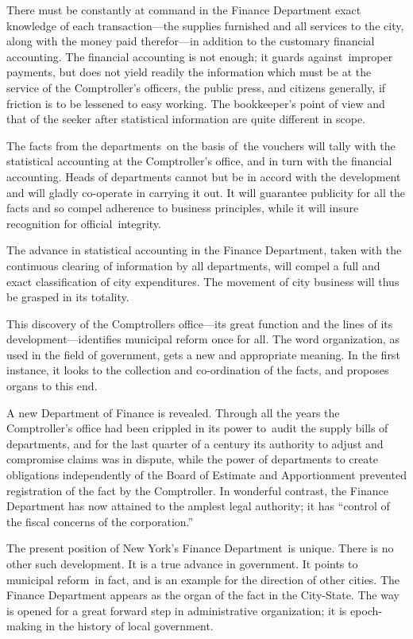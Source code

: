 \documentclass[openany,nobib]{tufte-book}
\begin{document}
There must be constantly at command in the Finance Department exact
knowledge of each transaction---the supplies furnished and all services
to the city, along with the money paid therefor---in addition to the
customary financial accounting. The financial accounting is not enough;
it guards against~improper payments, but does not yield readily the
information which must be at the service of the Comptroller's officers,
the public press, and citizens generally, if friction is to be lessened
to easy working. The bookkeeper's point of view and that of the seeker
after statistical information are quite different in scope.~

The facts from the departments~on the basis of~the vouchers will tally
with the statistical accounting at the Comptroller's office, and in turn
with the financial accounting. Heads of departments cannot but be in
accord with the development and will gladly co-operate in carrying it
out. It will guarantee publicity for all the facts and so compel
adherence to business principles, while it will insure recognition for
official~integrity.~

The advance in statistical accounting in the Finance Department, taken
with the continuous clearing of information by all departments, will
compel a full and exact classification of city expenditures. The
movement of city business will thus be grasped in its totality.~

This discovery of the Comptroller\textquotesingle s office---its great
function and the lines of its development---identifies municipal reform
once for all. The word organization, as used in the field of government,
gets a new and appropriate meaning. In the first instance, it looks to
the collection and co-ordination of the facts, and proposes organs to
this end.~

A new Department of Finance is revealed. Through all the years the
Comptroller's office had been crippled in its power to~audit the supply
bills of departments, and for the last quarter of a century its
authority to adjust and compromise claims was in dispute, while the
power of departments to create obligations independently of the Board of
Estimate and Apportionment prevented registration of the fact by the
Comptroller. In wonderful contrast, the Finance Department has now
attained to the amplest legal authority; it has ``control of the fiscal
concerns of the corporation.''~

The present position of New York's Finance Department~is unique. There
is no other such development. It is a true advance in government. It
points to municipal reform~in fact, and is an example for the direction
of other cities. The Finance Department appears as the organ of the fact
in the City-State. The way is opened for a great forward step in
administrative organization; it is epoch-making in the history of local
government.~~
\end{document}
